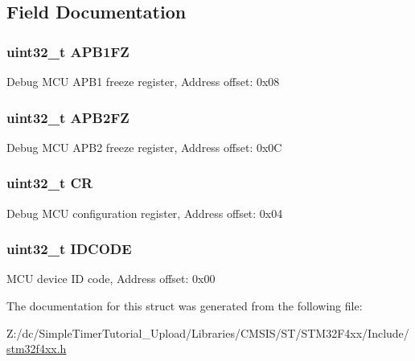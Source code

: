 \subsection{Field Documentation}
\hypertarget{struct_d_b_g_m_c_u___type_def_a5eaefc557573ae7bdc632ef6b6d574b5}{
\subsubsection[{A\-P\-B1\-F\-Z}]{ uint32\-\_\-t A\-P\-B1\-F\-Z}}\label{struct_d_b_g_m_c_u___type_def_a5eaefc557573ae7bdc632ef6b6d574b5}
Debug M\-C\-U A\-P\-B1 freeze register, Address offset\-: 0x08 \hypertarget{struct_d_b_g_m_c_u___type_def_a4628a8c32f97ef93b15b2b503ef90c75}{
\subsubsection[{A\-P\-B2\-F\-Z}]{ uint32\-\_\-t A\-P\-B2\-F\-Z}}\label{struct_d_b_g_m_c_u___type_def_a4628a8c32f97ef93b15b2b503ef90c75}
Debug M\-C\-U A\-P\-B2 freeze register, Address offset\-: 0x0\-C \hypertarget{struct_d_b_g_m_c_u___type_def_ab40c89c59391aaa9d9a8ec011dd0907a}{
\subsubsection[{C\-R}]{ uint32\-\_\-t C\-R}}\label{struct_d_b_g_m_c_u___type_def_ab40c89c59391aaa9d9a8ec011dd0907a}
Debug M\-C\-U configuration register, Address offset\-: 0x04 \hypertarget{struct_d_b_g_m_c_u___type_def_a24df28d0e440321b21f6f07b3bb93dea}{
\subsubsection[{I\-D\-C\-O\-D\-E}]{ uint32\-\_\-t I\-D\-C\-O\-D\-E}}\label{struct_d_b_g_m_c_u___type_def_a24df28d0e440321b21f6f07b3bb93dea}
M\-C\-U device I\-D code, Address offset\-: 0x00 

The documentation for this struct was generated from the following file\-:\begin{DoxyCompactItemize}
\item 
Z\-:/dc/\-Simple\-Timer\-Tutorial\-\_\-\-Upload/\-Libraries/\-C\-M\-S\-I\-S/\-S\-T/\-S\-T\-M32\-F4xx/\-Include/\hyperlink{stm32f4xx_8h}{stm32f4xx.\-h}\end{DoxyCompactItemize}
